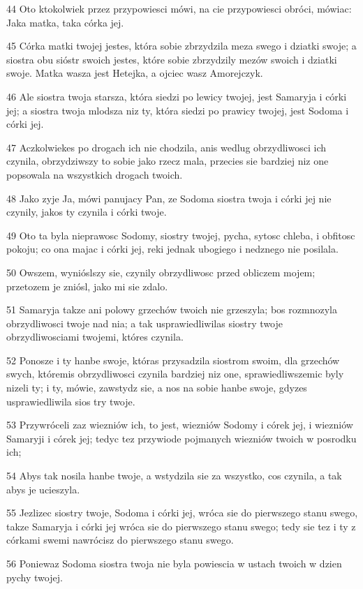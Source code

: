 \par 44 Oto ktokolwiek przez przypowiesci mówi, na cie przypowiesci obróci, mówiac: Jaka matka, taka córka jej.
\par 45 Córka matki twojej jestes, która sobie zbrzydzila meza swego i dziatki swoje; a siostra obu sióstr swoich jestes, które sobie zbrzydzily mezów swoich i dziatki swoje. Matka wasza jest Hetejka, a ojciec wasz Amorejczyk.
\par 46 Ale siostra twoja starsza, która siedzi po lewicy twojej, jest Samaryja i córki jej; a siostra twoja mlodsza niz ty, która siedzi po prawicy twojej, jest Sodoma i córki jej.
\par 47 Aczkolwiekes po drogach ich nie chodzila, anis wedlug obrzydliwosci ich czynila, obrzydziwszy to sobie jako rzecz mala, przecies sie bardziej niz one popsowala na wszystkich drogach twoich.
\par 48 Jako zyje Ja, mówi panujacy Pan, ze Sodoma siostra twoja i córki jej nie czynily, jakos ty czynila i córki twoje.
\par 49 Oto ta byla nieprawosc Sodomy, siostry twojej, pycha, sytosc chleba, i obfitosc pokoju; co ona majac i córki jej, reki jednak ubogiego i nedznego nie posilala.
\par 50 Owszem, wynióslszy sie, czynily obrzydliwosc przed obliczem mojem; przetozem je zniósl, jako mi sie zdalo.
\par 51 Samaryja takze ani polowy grzechów twoich nie grzeszyla; bos rozmnozyla obrzydliwosci twoje nad nia; a tak usprawiedliwilas siostry twoje obrzydliwosciami twojemi, któres czynila.
\par 52 Ponosze i ty hanbe swoje, któras przysadzila siostrom swoim, dla grzechów swych, któremis obrzydliwosci czynila bardziej niz one, sprawiedliwszemic byly nizeli ty; i ty, mówie, zawstydz sie, a nos na sobie hanbe swoje, gdyzes usprawiedliwila sios try twoje.
\par 53 Przywróceli zaz wiezniów ich, to jest, wiezniów Sodomy i córek jej, i wiezniów Samaryji i córek jej; tedyc tez przywiode pojmanych wiezniów twoich w posrodku ich;
\par 54 Abys tak nosila hanbe twoje, a wstydzila sie za wszystko, cos czynila, a tak abys je ucieszyla.
\par 55 Jezlizec siostry twoje, Sodoma i córki jej, wróca sie do pierwszego stanu swego, takze Samaryja i córki jej wróca sie do pierwszego stanu swego; tedy sie tez i ty z córkami swemi nawrócisz do pierwszego stanu swego.
\par 56 Poniewaz Sodoma siostra twoja nie byla powiescia w ustach twoich w dzien pychy twojej.
